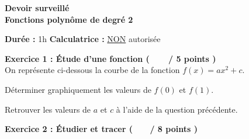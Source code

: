 \documentclass[12pt,a4paper]{exam}
\begin{document}
\begin{center}
    \Large\textbf{Devoir surveillé\\Fonctions polynôme de degré 2}
\end{center}

\vspace{0.3cm}

\noindent
\textbf{Durée :} 1h \hfill
\textbf{Calculatrice :} \underline{NON} autorisée

\vspace{0.5cm}

\noindent
\textbf{Exercice 1 : Étude d’une fonction (\ \ \ \  / 5 points )}
\vspace{5pt}
\noindent\\On représente ci-dessous la courbe de la fonction $f(x) = ax^2+c$.

\begin{center}
\end{center}


\begin{questions}

\question[2] Déterminer graphiquement les valeurs de $f(0)$ et $f(1)$.

\question[3] Retrouver les valeurs de $a$ et $c$ à l'aide de la question
précédente.

\end{questions}

\vspace{0.5cm}

\noindent
\textbf{Exercice 2 : Étudier et tracer ( \ \ \ / 8 points )}
\end{document}
